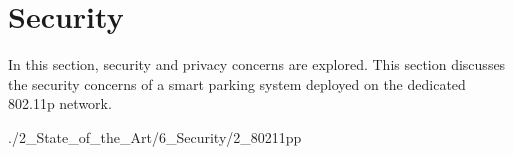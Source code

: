 \pagebreak

\section{Security}
In this section, security and privacy concerns are explored. This section discusses the security concerns of a smart parking system deployed on the dedicated 802.11p network.

{./2_State_of_the_Art/6_Security/2_80211pp}